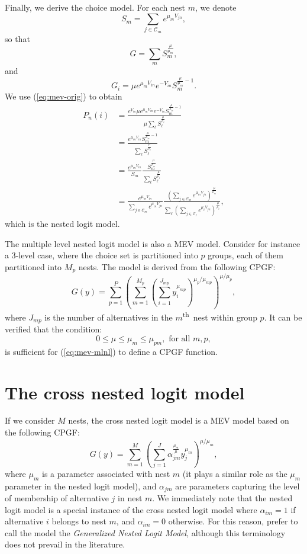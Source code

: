 \documentclass[12pt,a4paper]{article}
\newcommand{\req}[1]{(\ref{#1})}
\newcommand{\C}{\mathcal{C}}
\renewcommand{\th}{\textsuperscript{th}}
\begin{document}
Finally, we derive the choice model. 
 For each nest $m$, we denote
\[
S_m = \sum_{j \in \C_m} e^{\mu_m V_{jn}},
\]
so that
\[
G = \sum_m S_m^{\frac{\mu}{\mu_m}},
\]
and
\[
G_i = \mu e^{\mu_m V_{in}} e^{-V_{in}} S_m^{{\frac{\mu}{\mu_m}}-1}.
\]
We use \req{eq:mev-orig} to obtain
\[
\begin{aligned}
P_n(i)&= \frac{e^{V_{in}}\mu e^{\mu_m V_{in}} e^{-V_{in}}
  S_m^{{\frac{\mu}{\mu_m}}-1}}{\mu \sum_\ell S_\ell^{\frac{\mu}{\mu_\ell}}} \\
 &= \frac{e^{\mu_m V_{in}} 
  S_m^{{\frac{\mu}{\mu_m}}-1}}{ \sum_\ell S_\ell^{\frac{\mu}{\mu_\ell}}} \\
 &= \frac{e^{\mu_m V_{in}}}{S_m} \frac{S_m^{{\frac{\mu}{\mu_m}}}}{ \sum_\ell
  S_\ell^{\frac{\mu}{\mu_\ell}}} \\
&=\frac{e^{\mu_m V_{in}}}{\sum_{j \in \C_m} e^{\mu_m V_{jn}}} \frac{(\sum_{j \in \C_m} e^{\mu_m V_{jn}})^{{\frac{\mu}{\mu_m}}}}{ \sum_\ell
  (\sum_{j \in \C_\ell} e^{\mu_\ell V_{jn}})^{\frac{\mu}{\mu_\ell}}},
\end{aligned}
\]
which is the nested logit model.

The multiple level nested logit model is also a MEV model. Consider for instance a 3-level case, where the choice set is partitioned into $p$ groups, each of them partitioned into $M_p$ nests.  The model is derived from the following CPGF:
\begin{equation}
\label{eq:mev-mlnl}
G(y)= \sum_{p=1}^P \left(  \sum_{m=1}^{M_p} \left( \sum_{i=1}^{J_{mp}}  y_i^{\mu_{mp}} \right)^{\mu_p/\mu_{mp}}  \right)^{\mu/\mu_p},
\end{equation}
where $J_{mp}$ is the number of alternatives in the $m$\th\ nest within group $p$. It can be verified that the condition:
\[
0 \leq  \mu \leq \mu_m \leq \mu_{pm}, \text{ for all } m, p,
\]
 is sufficient for \req{eq:mev-mlnl} to define a CPGF function.



\section{The cross nested logit model}
\label{sec:9-mevCNL}


If we consider $M$ nests, the cross nested logit model is a MEV model based on the following CPGF:
\begin{equation}
\label{eq:mev-cnl}
G(y)= \sum_{m=1}^M \left( \sum_{j=1}^{J} \alpha_{jm}^{\frac{\mu_m}{\mu}} y_j^{\mu_m} \right)^{\mu/\mu_m},
\end{equation}
where $\mu_m$ is a parameter associated with nest $m$ (it plays a
similar role as the $\mu_m$ parameter in the nested logit model), and
$\alpha_{jm}$ are  parameters capturing the level of membership of alternative $j$ in nest $m$.  We immediately note that the nested logit model is a special instance of the cross nested logit model where $\alpha_{im} = 1$ if alternative $i$ belongs to nest $m$, and $\alpha_{im}=0$ otherwise. For this reason,   prefer to call the model the \emph{Generalized Nested Logit Model}, although this terminology does not prevail in the literature.
\end{document}
